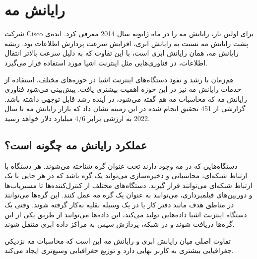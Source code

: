   \section{رایانش مه}
  شرکت Cisco برای اولین بار، رایانش مه را در ماه ژانویه سال 2014 معرفی کرد. ایده‌ی پشت رایانش مه نسبت به رایانش ابری، افزایش سرعت پردازش اطلاعات بود. ریشه رایانش مه، همان رایانش ابری است، با این تفاوت که به دلیل سرعت بالاتر انتقال اطلاعات، در فناوری‌هایی مثل اینترنت اشیا مورد استفاده قرار می‌گیرد.
  
  هم‌زمان با رشد و نفوذ دستگاه‌های اینترنت اشیا در حوزه‌های مختلف، استفاده از خدمات رایانش مه نیز در این حوزه اهمیت بیشتری یافت. پیش‌بینی می‌شود فناوری رایانش مه که محاسبات مه هم گفته می‌شود، در آینده رشد قابل توجهی داشته باشد. گزارشی از 451 تحقیق انجام شده در این زمینه نشان داد که بازار رایانش مه تا سال 2022 به ارزشی برابر 4/6 میلیارد دلار خواهد رسید.
  
  \subsection{عملکرد رایانش مه چگونه است؟}
  دستگاه‌هایی که در مه وجود دارند تحت عنوان گره شناخته می‌شوند. هر دستگاه با ارتباط شبکه‌ای، محاسباتی و ذخیره‌سازی می‌تواند یک گره باشد که در هر جایی با یک ارتباط شبکه‌ای می‌توانند قرار گیرند. دستگاه‌های مختلف از کنترل‌کننده‌ها تا مسیریاب‌ها و دوربین‌های فیلمبرداری، می‌توانند به عنوان یک گره مه عمل کنند. این گره‌ها می‌توانند در مناطق هدف مانند دفتر کار یا در یک وسیله نقلیه به‌کار گرفته شوند. وقتی یک دستگاه اینترنت اشیا داده‌هایی تولید می‌کند، این داده‌ها می‌توانند از طریق یکی از این گره‌ها دریافت شوند و در شبکه، پردازش سپس به مراکز داده ابری منتقل ‌شوند.
  
  تفاوت اصلی میان رایانش ابری و رایانش مه این است که محاسبات مه نزدیکی جغرافیایی بیشتری به کاربر نهایی دارد و توزیع جغرافیایی وسیع‌تری ایجاد می‌کند.
  
